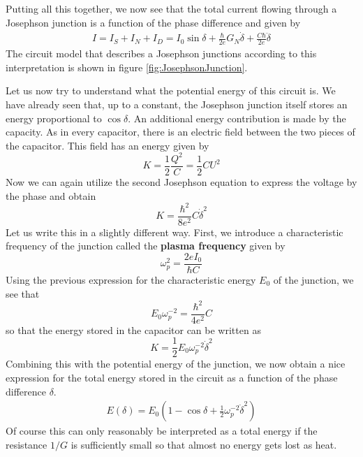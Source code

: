 \documentclass[a4paper, draft]{article}
\theoremstyle{own}
\theoremstyle{remark}
\begin{document}
Putting all this together, we now see that the total current flowing through a Josephson junction is a function of the phase difference and given by
\begin{align}
\label{eq:totalcurrent}
I = I_S + I_N + I_D = I_0 \sin \delta + \frac{\hbar}{2e} G_N \dot{\delta} + \frac{C \hbar}{2e} \ddot{\delta}
\end{align}
The circuit model that describes a Josephson junctions according to this interpretation is shown in figure \ref{fig:JosephsonJunction}. 

Let us now try to understand what the potential energy of this circuit is. We have already seen that, up to a constant, the Josephson junction itself stores an energy proportional to $\cos \delta$. An additional energy contribution is made by the capacity. As in every capacitor, there is an electric field between the two pieces of the capacitor. This field has an energy given by
$$
K = \frac{1}{2} \frac{Q^2}{C} = \frac{1}{2} C U^2
$$
Now we can again utilize the second Josephson equation to express the voltage by the phase and obtain
$$
K = \frac{\hbar^2}{8e^2} C \dot{\delta}^2
$$
Let us write this in a slightly different way. First, we introduce a characteristic frequency of the junction called the {\bf plasma frequency} given by
$$
\omega_p^2 = \frac{2e I_0}{\hbar C}
$$
Using the previous expression for the characteristic energy $E_0$ of the junction, we see that
$$
E_0 \omega_p^{-2} = \frac{\hbar^2}{4e^2} C
$$
so that the energy stored in the capacitor can be written as
$$
K = \frac{1}{2} E_0 \omega_p^{-2} \dot{\delta}^2
$$
Combining this with the potential energy of the junction, we now obtain a nice expression for the total energy stored in the circuit as a function of the phase difference $\delta$.
\begin{align}
\label{eq:junctionenergy}
E(\delta) = E_0(1 - \cos \delta +\frac{1}{2} \omega_p^{-2} \dot{\delta}^2)
\end{align}
Of course this can only reasonably be interpreted as a total energy if the resistance $1 / G$ is sufficiently small so that almost no energy gets lost as heat. 
\end{document}

